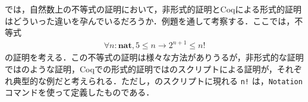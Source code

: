 \documentclass[submit]{ipsj}
\begin{document}

では，自然数上の不等式の証明において，非形式的証明とCoqによる形式的証明はどういった違いを孕んでいるだろうか．例題を通して考察する．ここでは，不等式
\begin{eqnarray}
\forall n : \mathbf{nat} \mathrel{,} 5 \leq n \to 2^{n + 1} \leq n! \label{fml:ineq}
\end{eqnarray}
の証明を考える．この不等式の証明は様々な方法がありうるが，非形式的な証明ではのような証明，Coqでの形式的証明ではのスクリプトによる証明が，それぞれ典型的な例だと考えられる．ただし，のスクリプトに現れる \verb+n!+ は，\verb+Notation+コマンドを使って定義したものである．
\end{document}
